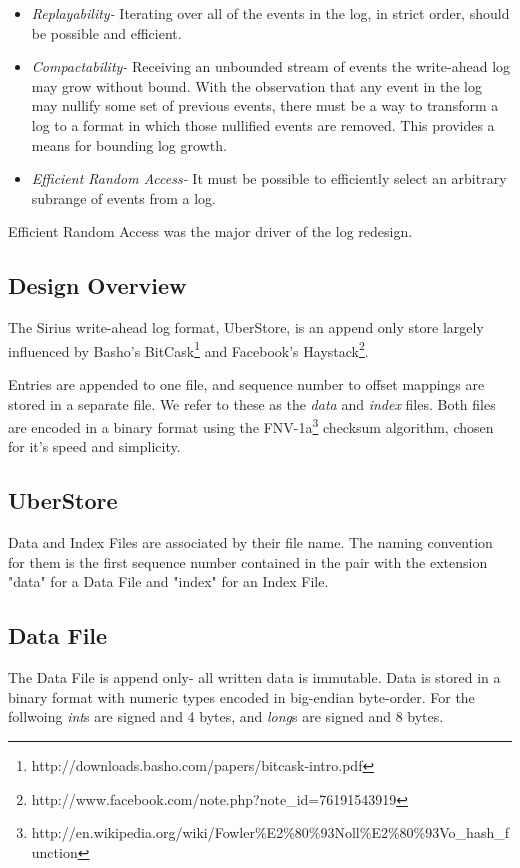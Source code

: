 \documentclass[11pt]{article}
\begin{document}
\begin{itemize}
\item {\em Replayability-} 
    Iterating over all of the events in the log, in strict order, 
    should be possible and efficient.
\item {\em Compactability-}
    Receiving an unbounded stream of events the write-ahead log
    may grow without bound. With the observation that any event
    in the log may nullify some set of previous events, there must
    be a way to transform a log to a format in which those nullified
    events are removed. This provides a means for bounding log growth.
\item {\em Efficient Random Access-}
    It must be possible to efficiently select an arbitrary subrange of
    events from a log.
\end{itemize}

Efficient Random Access was the major driver of the log redesign.


\subsection{Design Overview}
The Sirius write-ahead log format, UberStore, is an append only store largely influenced
by Basho's BitCask\footnote{http://downloads.basho.com/papers/bitcask-intro.pdf} and
Facebook's Haystack\footnote{http://www.facebook.com/note.php?note\_id=76191543919}.

Entries are appended to one file, and sequence number to offset mappings are stored
in a separate file. We refer to these as the {\em data} and {\em index} files. Both files
are encoded in a binary format using the FNV-1a\footnote{http://en.wikipedia.org/wiki/Fowler\%E2\%80\%93Noll\%E2\%80\%93Vo\_hash\_function}
checksum algorithm, chosen for it's speed and simplicity.

\subsection{UberStore}
Data and Index Files are associated by their file name.  The naming convention for them
is the first sequence number contained in the pair with the extension "data" for a
Data File and "index" for an Index File.

\subsection{Data File}
The Data File is append only- all written data is immutable.  Data is stored in a binary
format with numeric types encoded in big-endian byte-order. For the follwoing {\em int}s
are signed and 4 bytes, and {\em long}s are signed and 8 bytes.
\end{document}
